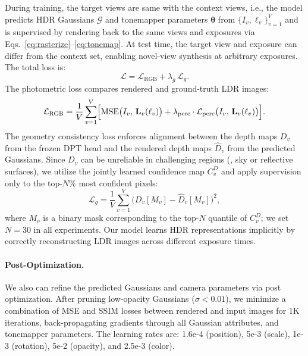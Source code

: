 \documentclass[runningheads]{llncs}
\begin{document}
During training, the target views are same with the context views, i.e., the model predicts HDR Gaussians $\mathcal{G}$ and tonemapper parameters $\boldsymbol{\theta}$ from $\{I_v, \ell_v\}_{v=1}^{V}$ and is supervised by rendering back to the same views and exposures via Eqs.~\eqref{eq:rasterize}--\eqref{eq:tonemap}.
At test time, the target view and exposure can differ from the context set, enabling novel-view synthesis at arbitrary exposures.
The total loss is:
\begin{equation}
    \mathcal{L} = \mathcal{L}_{\text{RGB}} + \lambda_g \,\mathcal{L}_g.
\end{equation}
The photometric loss compares rendered and ground-truth LDR images:
\begin{equation}
    \mathcal{L}_{\text{RGB}}
    = \frac{1}{V}\sum_{v=1}^{V}
    \Bigl[
      \mathrm{MSE}\bigl(I_v,\, \mathbf{L}_v(\ell_v)\bigr)
      + \lambda_{\text{perc}} \cdot \mathcal{L}_{\text{perc}}\bigl(I_v,\, \mathbf{L}_v(\ell_v)\bigr)
    \Bigr].
\end{equation}
The geometry consistency loss enforces alignment between the depth maps $D_v$ from the frozen DPT head and the rendered depth maps $\hat{D}_v$ from the predicted Gaussians.
Since $D_v$ can be unreliable in challenging regions (\eg, sky or reflective surfaces), we utilize the jointly learned confidence map $C_v^{D}$ and apply supervision only to the top-$N\%$ most confident pixels:
\begin{equation}
    \mathcal{L}_g = \frac{1}{V}\sum_{v=1}^{V} \bigl(D_v[M_v] - \hat{D}_v[M_v]\bigr)^2,
\end{equation}
where $M_v$ is a binary mask corresponding to the top-$N$ quantile of $C_v^{D}$; we set $N{=}30$ in all experiments.
Our model learns HDR representations implicitly by correctly reconstructing LDR images across different exposure times.

\paragraph{\textbf{Post-Optimization.}}
We also can refine the predicted Gaussians and camera parameters via post optimization.
After pruning low-opacity Gaussians ($\sigma < 0.01$), we minimize a combination of MSE and SSIM losses between rendered and input images for 1K iterations, back-propagating gradients through all Gaussian attributes, and tonemapper parameters.
The learning rates are: 1.6e-4 (position), 5e-3 (scale), 1e-3 (rotation), 5e-2 (opacity), and 2.5e-3 (color).
\end{document}
